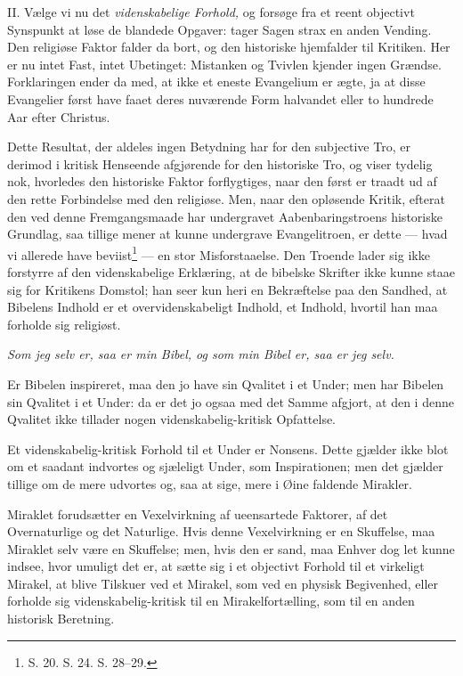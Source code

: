 \documentclass[12pt,a4paper]{book}
\newcommand{\opage}[1]{\marginnote{\footnotesize\textit{[#1]}}}
\begin{document}
II. Vælge vi nu det \emph{videnskabelige Forhold,} og forsøge fra et reent
objectivt Synspunkt at løse de blandede Opgaver: tager Sagen strax en anden
Vending. Den religiøse Faktor falder da bort, og den historiske hjemfalder til
Kritiken. Her er nu intet Fast, intet Ubetinget: Mistanken og Tvivlen kjender
ingen Grændse. Forklaringen ender da med, at ikke et eneste Evangelium er ægte,
ja at disse Evangelier først have faaet deres nuværende Form halvandet eller to
hundrede Aar efter Christus.

Dette Resultat, der aldeles ingen Betydning har for den subjective Tro, er
derimod i kritisk Henseende afgjørende for den
\opage{47} historiske Tro, og viser tydelig nok, hvorledes den historiske Faktor
forflygtiges, naar den først er traadt ud af den rette Forbindelse med den
religiøse. Men, naar den opløsende Kritik, efterat den ved denne
Fremgangsmaade har undergravet Aabenbaringstroens historiske Grundlag, saa
tillige mener at kunne undergrave Evangelitroen, er dette --- hvad vi allerede
have beviist\footnote{S. 20. S. 24. S. 28--29.} --- en stor Misforstaaelse. Den
Troende lader sig ikke forstyrre af den videnskabelige Erklæring, at de
bibelske Skrifter ikke kunne staae sig for Kritikens Domstol; han seer kun heri
en Bekræftelse paa den Sandhed, at Bibelens Indhold er et overvidenskabeligt
Indhold, et Indhold, hvortil han maa forholde sig religiøst.

\emph{Som jeg selv er, saa er min Bibel, og som min Bibel er, saa er jeg selv.}

Er Bibelen inspireret, maa den jo have sin Qvalitet i et Under; men har Bibelen
sin Qvalitet i et Under: da er det jo ogsaa med det Samme afgjort, at den i
denne Qvalitet ikke tillader nogen videnskabelig-kritisk Opfattelse.

Et videnskabelig-kritisk Forhold til et Under er Nonsens. Dette gjælder ikke
blot om et saadant indvortes og sjæleligt Under, som Inspirationen; men det
gjælder tillige om de mere udvortes og, saa at sige, mere i Øine faldende
Mirakler.

Miraklet forudsætter en Vexelvirkning af ueensartede Faktorer, af det
Overnaturlige og det Naturlige. Hvis denne Vexelvirkning er en Skuffelse, maa
Miraklet selv være en Skuffelse; men, hvis den er sand, maa Enhver dog let
kunne indsee, hvor umuligt det er, at sætte sig i et objectivt Forhold til et
virkeligt Mirakel, at blive Tilskuer ved et Mirakel, som ved en physisk
Begivenhed, eller forholde sig videnskabelig-kritisk til en Mirakelfortælling,
som til en anden historisk Beretning.
\end{document}
